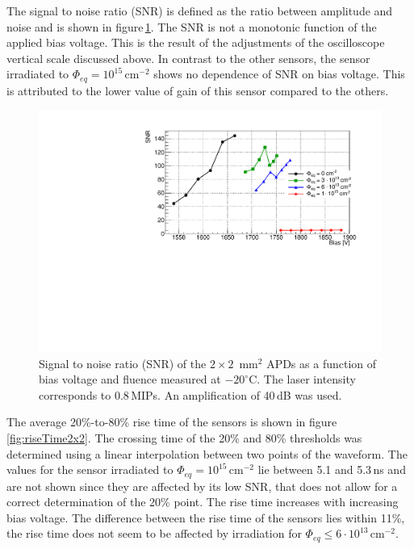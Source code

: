 \documentclass[review,number,sort&compress]{elsarticle}
\begin{document}
The signal to noise ratio (SNR) is defined as the ratio between amplitude and noise and is shown in figure\,\ref{fig:snr2x2}.
The SNR is not a monotonic function of the applied bias voltage.
This is the result of the adjustments of the oscilloscope vertical scale discussed above.
In contrast to the other sensors, the sensor irradiated to $\Phi_{eq} = 10^{15}$\,cm$^{-2}$ shows no dependence of SNR on bias voltage.
This is attributed to the lower value of gain of this sensor compared to the others.

\begin{figure}
  \centering
  \includegraphics[width = 0.6 \columnwidth]{snr2x2APDs}
  \caption{Signal to noise ratio (SNR) of the $2 \times 2$~mm$^2$ APDs as a function of bias voltage and fluence measured at $-20^\circ$C. The laser intensity corresponds to 0.8\,MIPs. An amplification of 40\,dB was used.}
  \label{fig:snr2x2}
\end{figure}

The average 20\%-to-80\% rise time of the sensors is shown in figure\,\ref{fig:riseTime2x2}.
The crossing time of the 20\% and 80\% thresholds was determined using a linear interpolation between two points of the waveform.
The values for the sensor irradiated to $\Phi_{eq} = 10^{15}$\,cm$^{-2}$ lie between 5.1 and 5.3\,ns and are not shown since they are affected by its low SNR, that does not allow for a correct determination of the 20\% point.
The rise time increases with increasing bias voltage.
The difference between the rise time of the sensors lies within 11\%, the rise time does not seem to be affected by irradiation for $\Phi_{eq} \leq 6 \cdot 10^{13}$\,cm$^{-2}$.
\end{document}

